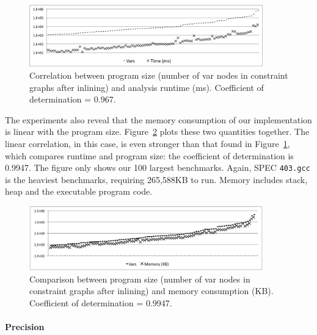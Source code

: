 \documentclass{paper}
\begin{document}
\begin{figure}[t!]
\begin{center}
\includegraphics[width=0.9\textwidth]{images/TimeCorr}
\end{center}
\caption{\label{fig:TimeCorr}
Correlation between program size (number of var nodes in constraint
graphs after inlining) and analysis runtime (ms).
Coefficient of determination = 0.967.
}
\end{figure}

The experiments also reveal that the memory consumption of our implementation
is linear with the program size.
Figure~\ref{fig:MemCorr} plots these two quantities together.
The linear correlation, in this case, is even stronger than that found in
Figure~\ref{fig:TimeCorr}, which compares runtime and program size: the
coefficient of determination is 0.9947.
The figure only shows our 100 largest benchmarks.
Again, SPEC \texttt{403.gcc} is the heaviest benchmarks, requiring
265,588KB to run.
Memory includes stack, heap and the executable program code.

\begin{figure}[t!]
\begin{center}
\includegraphics[width=0.9\textwidth]{images/MemCorr}
\end{center}
\caption{\label{fig:MemCorr}
Comparison between program size (number of var nodes in constraint
graphs after inlining) and memory consumption (KB).
Coefficient of determination = 0.9947.
}
\end{figure}

\paragraph{Precision}
\end{document}
